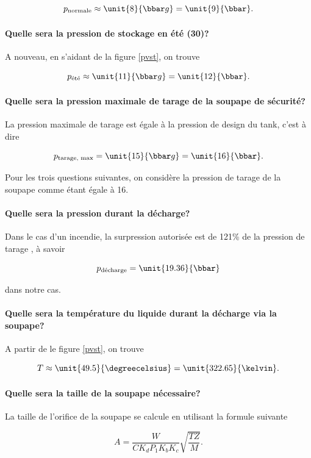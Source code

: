 $$p_{\text{normale}} \approx \unit{8}{\bbar g} = \unit{9}{\bbar}.$$

\paragraph{Quelle sera la pression de stockage en été 
(\unit{30}{\degreecelsius})?}
A nouveau, en s'aidant de la figure \ref{pvst}, on trouve

$$p_{\text{été}} \approx \unit{11}{\bbar g} = \unit{12}{\bbar}.$$

\paragraph{Quelle sera la pression maximale de tarage
de la soupape de sécurité?}
La pression maximale de tarage est égale à la pression de 
design du tank, c'est à dire

$$p_{\text{tarage, max}} = \unit{15}{\bbar g} = \unit{16}{\bbar}.$$

Pour les trois questions suivantes, on considère la pression
de tarage de la soupape comme étant égale à \unit{16}{\bbar}.

\paragraph{Quelle sera la pression durant la décharge?}
Dans le cas d'un incendie, la surpression autorisée est de 121\%
de la pression de tarage \cite{mignon}, à savoir 

$$p_{\text{décharge}} = \unit{19.36}{\bbar}$$

dans notre cas.

\paragraph{Quelle sera la température du liquide durant
la décharge via la soupape?}
A partir de le figure \ref{pvst}, on trouve 

$$T \approx \unit{49.5}{\degreecelsius} = \unit{322.65}{\kelvin}.$$

\paragraph{Quelle sera la taille de la soupape nécessaire?}
La taille de l'orifice de la soupape se calcule en utilisant la formule
suivante \cite{mignon} 

$$A = \frac{W}{CK_dP_1K_bK_c}\sqrt{\frac{TZ}{M}}.$$

